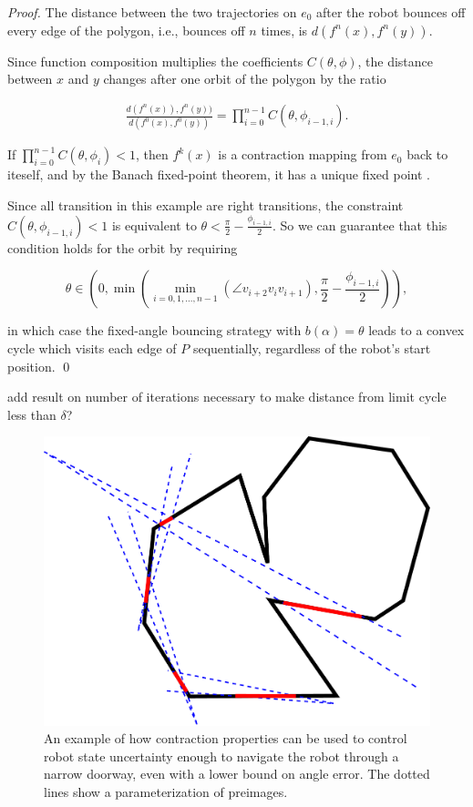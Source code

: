 \documentclass[]{styles/svproc}  %
\begin{document}
\begin{proof}
The distance between the two trajectories on $e_0$ after the robot bounces off
every edge of the polygon, i.e., bounces off $n$ times, is
$d(f^{n}(x), f^{n}(y))$.

Since function composition multiplies the coefficients $C(\theta, \phi)$, 
the distance between $x$ and $y$ changes after one orbit of the polygon by the
ratio

\begin{eqnarray*}
\frac{d(f^{n}(x)), f^{n}(y))}{d(f^{0}(x), f^{0}(y))} = \prod_{i = 0}^{n-1}
C(\theta, \phi_{i-1, i}).
\end{eqnarray*}

If $\prod_{i = 0}^{n-1} C(\theta, \phi_{i}) < 1$, then $f^k(x)$ is a contraction
mapping from $e_0$ back to iteself, and by the Banach fixed-point theorem, it
has a unique fixed point \cite{Granas2003}.

Since all transition in this example are right transitions, the constraint $C(\theta,\phi_{i-1, i})<1$ is equivalent to $\theta < \frac{\pi}{2}-\frac{\phi_{i-1, i}}{2}$. So we can guarantee that this condition holds for the orbit by requiring

\begin{equation*}
\theta \in (0, \min(\min_{i = 0, 1, \dots, n-1}(\angle v_{i+2}v_{i}v_{i+1}),
\frac{\pi}{2}-\frac{\phi_{i-1, i}}{2})),
\end{equation*}

in which case the fixed-angle bouncing strategy with $b(\alpha) = \theta$ leads to a convex
cycle which visits each edge of $P$ sequentially, regardless of the robot's start position.
\qed

\end{proof}

{\color{red} add result on number of iterations necessary to make distance from
limit cycle less than $\delta$?}

\begin{figure}
    \includegraphics[width=0.6\linewidth]{figures/bounce_preimages.pdf}
    \centering
    \caption{An example of how contraction properties can be used to control
robot state uncertainty enough to navigate the robot through a narrow doorway,
even with a lower bound on angle error. The dotted lines show a 
parameterization of preimages.}
\label{fig:preimage_example}
\end{figure}
\end{document}
